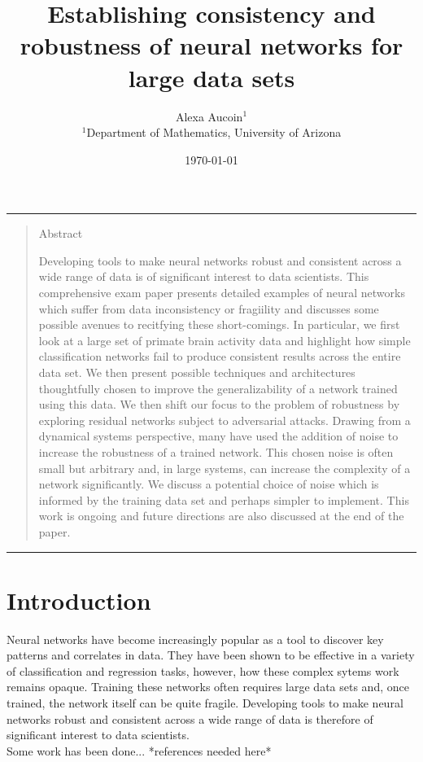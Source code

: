 \documentclass[12pt]{article}
\title{Establishing consistency and robustness of neural networks for large data sets}
\author{Alexa Aucoin$^{1}$ \\ \normalsize{$^{1}$Department of Mathematics, University of Arizona}}
\date{\today}
\newenvironment{sciabstract}{%
\begin{quote} \bf}
{\end{quote}}
\begin{document}
\maketitle

\hrule
\begin{sciabstract}
\begin{center} \large{Abstract}\end{center}
Developing tools to make neural networks robust and consistent across a wide range of data is of significant interest to data scientists. This comprehensive exam paper presents detailed examples of neural networks which suffer from data inconsistency or fragiility and discusses some possible avenues to recitfying these short-comings. In particular, we first look at a large set of primate brain activity data and highlight how simple classification networks fail to produce consistent results across the entire data set. We then present possible techniques and architectures thoughtfully chosen to improve the generalizability of a network trained using this data. We then shift our focus to the problem of robustness by exploring residual networks subject to adversarial attacks. Drawing from a dynamical systems perspective, many have used the addition of noise to increase the robustness of a trained network. This chosen noise is often small but arbitrary and, in large systems, can increase the complexity of a network significantly. We discuss a potential choice of noise which is informed by the training data set and perhaps simpler to implement. This work is ongoing and future directions are also discussed at the end of the paper.
\end{sciabstract}
\hrule

\section{Introduction}Neural networks have become increasingly popular as a tool to discover key patterns and correlates in data. They have been shown to be effective in a variety of classification and regression tasks, however, how these complex sytems work remains opaque. Training these networks often requires large data sets and, once trained, the network itself can be quite fragile. Developing tools to make neural networks robust and consistent across a wide range of data is therefore of significant interest to data scientists. \\
Some work has been done...
*references needed here*
\end{document}
